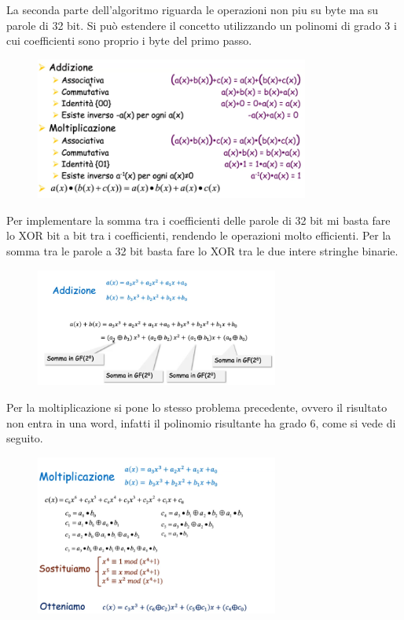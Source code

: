 \vspace{5mm}

La seconda parte dell'algoritmo riguarda le operazioni non piu su byte ma su parole di 32 bit. Si può estendere il concetto utilizzando un polinomi di grado 3 i cui coefficienti sono proprio i byte del primo passo.  
  
\begin{figure}[htb!]
    \centering
    \includegraphics[width=9cm]{./Images/cap1/1.20.png}
\end{figure}   

Per implementare la somma tra i coefficienti delle parole di 32 bit mi basta fare lo XOR bit a bit tra i coefficienti, rendendo le operazioni molto efficienti. Per la somma tra le parole a 32 bit basta fare lo XOR tra le due intere stringhe binarie.

\begin{figure}[htb!]
    \centering
    \includegraphics[width=8cm]{./Images/cap1/1.21.png}
\end{figure} 

Per la moltiplicazione si pone lo stesso problema precedente, ovvero il risultato non entra in una word, infatti il polinomio risultante ha grado 6, come si vede di seguito.

\begin{figure}[htb!]
    \centering
    \includegraphics[width=8cm]{./Images/cap1/1.22.png}
\end{figure} 

